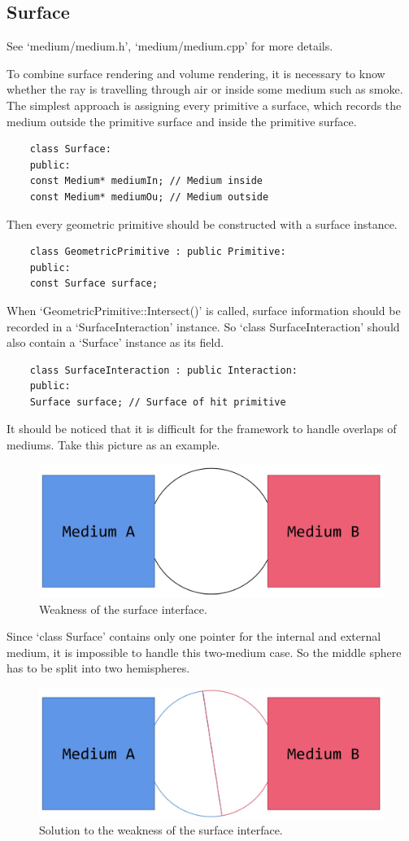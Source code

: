 \documentclass[acmtog]{acmart}
\begin{document}
\subsection{Surface}
See `medium/medium.h', `medium/medium.cpp' for more details.\par
To combine surface rendering and volume rendering, 
it is necessary to know whether the ray is travelling through air or inside some medium such as smoke.
The simplest approach is assigning every primitive a surface, 
which records the medium outside the primitive surface and inside the primitive surface.
\begin{lstlisting}
	class Surface:
	public:
	const Medium* mediumIn; // Medium inside
	const Medium* mediumOu; // Medium outside
\end{lstlisting}
Then every geometric primitive should be constructed with a surface instance.
\begin{lstlisting}
	class GeometricPrimitive : public Primitive:
	public:
	const Surface surface;
\end{lstlisting}
When `GeometricPrimitive::Intersect()' is called, surface information should be recorded in a `SurfaceInteraction' instance.
So `class SurfaceInteraction' should also contain a `Surface' instance as its field.
\begin{lstlisting}
	class SurfaceInteraction : public Interaction:
	public:
	Surface surface; // Surface of hit primitive
\end{lstlisting}
It should be noticed that it is difficult for the framework to handle overlaps of mediums.
Take this picture as an example.
\begin{figure}[H]
	\includegraphics[scale=0.04]{pictures/surface weakness.png}
	\centering
	\caption{Weakness of the surface interface.}
\end{figure}
Since `class Surface' contains only one pointer for the internal and external medium, 
it is impossible to handle this two-medium case.
So the middle sphere has to be split into two hemispheres.
\begin{figure}[H]
	\includegraphics[scale=0.04]{pictures/surface weakness solution.png}
	\centering
	\caption{Solution to the weakness of the surface interface.}
\end{figure}
\end{document}
